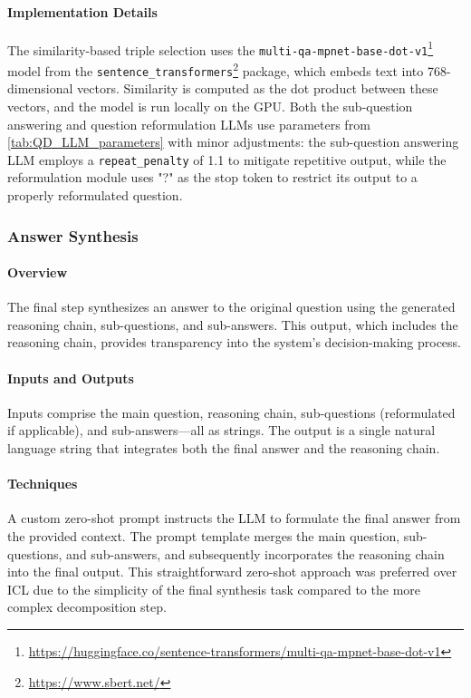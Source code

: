 \documentclass[pdflatex,sn-mathphys-num]{sn-jnl}%
\theoremstyle{thmstyleone}%
\theoremstyle{thmstyletwo}%
\theoremstyle{thmstylethree}%
\begin{document}
\paragraph{Implementation Details}  
The similarity-based triple selection uses the \texttt{multi-qa-mpnet-base-dot-v1}\footnote{\url{https://huggingface.co/sentence-transformers/multi-qa-mpnet-base-dot-v1}} model from the \texttt{sentence\_transformers}\footnote{\url{https://www.sbert.net/}} package, which embeds text into 768-dimensional vectors. Similarity is computed as the dot product between these vectors, and the model is run locally on the GPU.  
Both the sub-question answering and question reformulation LLMs use parameters from \autoref{tab:QD_LLM_parameters} with minor adjustments: the sub-question answering LLM employs a \texttt{repeat\_penalty} of 1.1 to mitigate repetitive output, while the reformulation module uses "?" as the stop token to restrict its output to a properly reformulated question.


\subsubsection{Answer Synthesis}
\paragraph{Overview}  
The final step synthesizes an answer to the original question using the generated reasoning chain, sub-questions, and sub-answers. This output, which includes the reasoning chain, provides transparency into the system's decision-making process.

\paragraph{Inputs and Outputs}  
Inputs comprise the main question, reasoning chain, sub-questions (reformulated if applicable), and sub-answers—all as strings. The output is a single natural language string that integrates both the final answer and the reasoning chain.

\paragraph{Techniques}  
A custom zero-shot prompt instructs the LLM to formulate the final answer from the provided context. The prompt template merges the main question, sub-questions, and sub-answers, and subsequently incorporates the reasoning chain into the final output. This straightforward zero-shot approach was preferred over ICL due to the simplicity of the final synthesis task compared to the more complex decomposition step.
\end{document}
